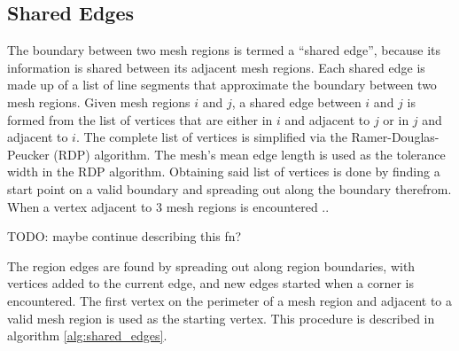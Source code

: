 \subsection{Shared Edges}
The boundary between two mesh regions is termed a ``shared edge'', because its information is shared between its adjacent mesh regions.
Each shared edge is made up of a list of line segments that approximate the boundary between two mesh regions.
Given mesh regions $i$ and $j$, a shared edge between $i$ and $j$ is formed from the list of vertices that are either in $i$ and adjacent to $j$ or in $j$ and adjacent to $i$.
The complete list of vertices is simplified via the Ramer-Douglas-Peucker (RDP) algorithm\cite{RDP_line_reduction}.
The mesh's mean edge length is used as the tolerance width in the RDP algorithm.
Obtaining said list of vertices is done by finding a start point on a valid boundary and spreading out along the boundary therefrom.
When a vertex adjacent to 3 mesh regions is encountered ..

TODO: maybe continue describing this fn?

The region edges are found by spreading out along region boundaries, with vertices added to the current edge, and new edges started when a corner is encountered.
The first vertex on the perimeter of a mesh region and adjacent to a valid mesh region is used as the starting vertex.
This procedure is described in algorithm \ref{alg:shared_edges}.

